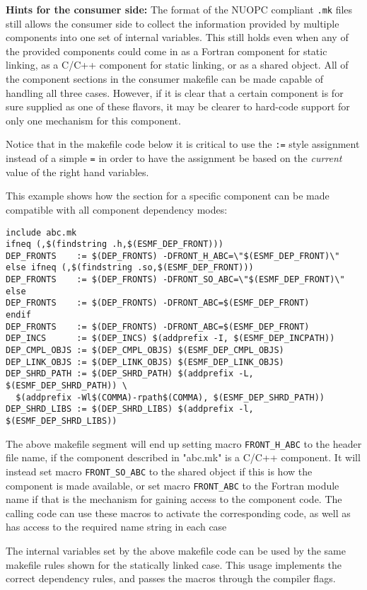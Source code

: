 {\bf Hints for the consumer side:} The format of the NUOPC compliant {\tt .mk} files still allows the consumer side to collect the information provided by multiple components into one set of internal variables. This still holds even when any of the provided components could come in as a Fortran component for static linking, as a C/C++ component for static linking, or as a shared object. All of the component sections in the consumer makefile can be made capable of handling all three cases. However, if it is clear that a certain component is for sure supplied as one of these flavors, it may be clearer to hard-code support for only one mechanism for this component. 

Notice that in the makefile code below it is critical to use the {\tt :=} style assignment instead of a simple {\tt =} in order to have the assignment be based on the {\em current} value of the right hand variables.

This example shows how the section for a specific component can be made compatible with all component dependency modes:

\begin{verbatim}
include abc.mk
ifneq (,$(findstring .h,$(ESMF_DEP_FRONT)))
DEP_FRONTS    := $(DEP_FRONTS) -DFRONT_H_ABC=\"$(ESMF_DEP_FRONT)\"
else ifneq (,$(findstring .so,$(ESMF_DEP_FRONT)))
DEP_FRONTS    := $(DEP_FRONTS) -DFRONT_SO_ABC=\"$(ESMF_DEP_FRONT)\"
else
DEP_FRONTS    := $(DEP_FRONTS) -DFRONT_ABC=$(ESMF_DEP_FRONT)
endif
DEP_FRONTS    := $(DEP_FRONTS) -DFRONT_ABC=$(ESMF_DEP_FRONT)
DEP_INCS      := $(DEP_INCS) $(addprefix -I, $(ESMF_DEP_INCPATH))
DEP_CMPL_OBJS := $(DEP_CMPL_OBJS) $(ESMF_DEP_CMPL_OBJS)
DEP_LINK_OBJS := $(DEP_LINK_OBJS) $(ESMF_DEP_LINK_OBJS)
DEP_SHRD_PATH := $(DEP_SHRD_PATH) $(addprefix -L, $(ESMF_DEP_SHRD_PATH)) \
  $(addprefix -Wl$(COMMA)-rpath$(COMMA), $(ESMF_DEP_SHRD_PATH))
DEP_SHRD_LIBS := $(DEP_SHRD_LIBS) $(addprefix -l, $(ESMF_DEP_SHRD_LIBS))
\end{verbatim}

The above makefile segment will end up setting macro {\tt FRONT\_H\_ABC} to the header file name, if the component described in "abc.mk" is a C/C++ component. It will instead set macro {\tt FRONT\_SO\_ABC} to the shared object if this is how the component is made available, or set macro {\tt FRONT\_ABC} to the Fortran module name if that is the mechanism for gaining access to the component code. The calling code can use these macros to activate the corresponding code, as well as has access to the required name string in each case

The internal variables set by the above makefile code can be used by the same makefile rules shown for the statically linked case. This usage implements the correct dependency rules, and passes the macros through the compiler flags.

